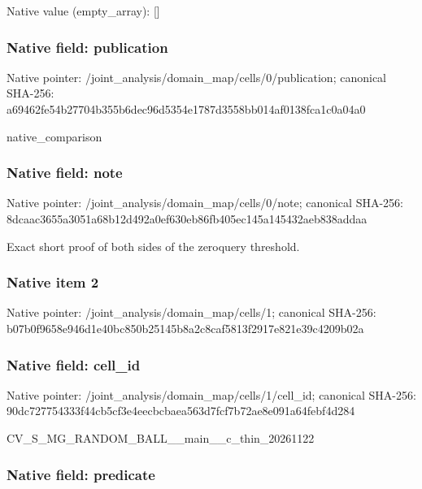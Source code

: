 \documentclass[10pt,a4paper]{article}
\begin{document}
Native value (empty\_array): []



\subsubsection{Native field: publication}


Native pointer: /joint\_analysis/domain\_m\allowbreak{}ap/cells/0/publication; canonical SHA-256: a69462fe54b27704b355b6de\allowbreak{}c96d5354e1787d3558bb014a\allowbreak{}f0138fca1c0a04a0


native\_comparison


\subsubsection{Native field: note}


Native pointer: /joint\_analysis/domain\_map/cells/0/note; canonical SHA-256: 8dcaac3655a3051a68b12d49\allowbreak{}2a0ef630eb86fb405ec145a1\allowbreak{}45432aeb838addaa


Exact short proof of both sides of the zeroquery threshold.


\subsubsection{Native item 2}


Native pointer: /joint\_analysis/domain\_map/cells/1; canonical SHA-256: b07b0f9658e946d1e40bc850\allowbreak{}b25145b8a2c8caf5813f2917\allowbreak{}e821e39c4209b02a



\subsubsection{Native field: cell\_id}


Native pointer: /joint\_analysis/domain\_m\allowbreak{}ap/cells/1/cell\_id; canonical SHA-256: 90dc727754333f44cb5cf3e4\allowbreak{}eecbcbaea563d7fcf7b72ae8\allowbreak{}e091a64febf4d284


CV\_S\_MG\_RANDOM\_BALL\_\_mai\allowbreak{}n\_\_c\_thin\_20261122


\subsubsection{Native field: predicate}
\end{document}
